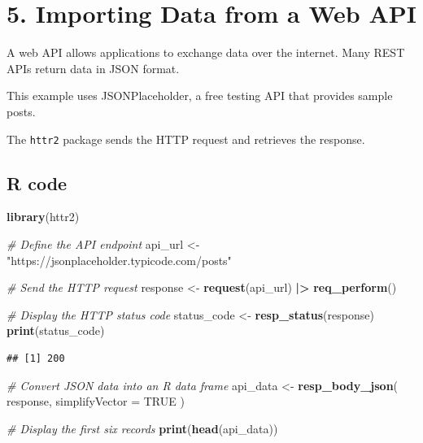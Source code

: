 \documentclass[
]{article}
\newenvironment{Shaded}{\begin{snugshade}}{\end{snugshade}}
\newcommand{\AttributeTok}[1]{\textcolor[rgb]{0.13,0.29,0.53}{#1}}
\newcommand{\CommentTok}[1]{\textcolor[rgb]{0.56,0.35,0.01}{\textit{#1}}}
\newcommand{\ConstantTok}[1]{\textcolor[rgb]{0.56,0.35,0.01}{#1}}
\newcommand{\FunctionTok}[1]{\textcolor[rgb]{0.13,0.29,0.53}{\textbf{#1}}}
\newcommand{\NormalTok}[1]{#1}
\newcommand{\OtherTok}[1]{\textcolor[rgb]{0.56,0.35,0.01}{#1}}
\newcommand{\SpecialCharTok}[1]{\textcolor[rgb]{0.81,0.36,0.00}{\textbf{#1}}}
\newcommand{\StringTok}[1]{\textcolor[rgb]{0.31,0.60,0.02}{#1}}
\begin{document}
\section{5. Importing Data from a Web
API}\label{importing-data-from-a-web-api}

A web API allows applications to exchange data over the internet. Many
REST APIs return data in JSON format.

This example uses JSONPlaceholder, a free testing API that provides
sample posts.

The \texttt{httr2} package sends the HTTP request and retrieves the
response.

\subsection{R code}\label{r-code-4}

\begin{Shaded}
\begin{Highlighting}[]
\FunctionTok{library}\NormalTok{(httr2)}

\CommentTok{\# Define the API endpoint}
\NormalTok{api\_url }\OtherTok{\textless{}{-}} \StringTok{"https://jsonplaceholder.typicode.com/posts"}

\CommentTok{\# Send the HTTP request}
\NormalTok{response }\OtherTok{\textless{}{-}} \FunctionTok{request}\NormalTok{(api\_url) }\SpecialCharTok{|\textgreater{}}
  \FunctionTok{req\_perform}\NormalTok{()}

\CommentTok{\# Display the HTTP status code}
\NormalTok{status\_code }\OtherTok{\textless{}{-}} \FunctionTok{resp\_status}\NormalTok{(response)}
\FunctionTok{print}\NormalTok{(status\_code)}
\end{Highlighting}
\end{Shaded}

\begin{verbatim}
## [1] 200
\end{verbatim}

\begin{Shaded}
\begin{Highlighting}[]
\CommentTok{\# Convert JSON data into an R data frame}
\NormalTok{api\_data }\OtherTok{\textless{}{-}} \FunctionTok{resp\_body\_json}\NormalTok{(}
\NormalTok{  response,}
  \AttributeTok{simplifyVector =} \ConstantTok{TRUE}
\NormalTok{)}

\CommentTok{\# Display the first six records}
\FunctionTok{print}\NormalTok{(}\FunctionTok{head}\NormalTok{(api\_data))}
\end{Highlighting}
\end{Shaded}
\end{document}
